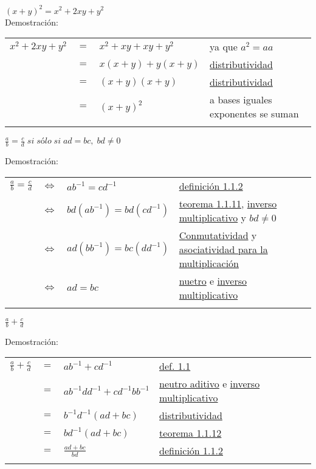 \begin{teo}
$(x+y)^2=x^2+2xy+y^2$\\ \label{teo 1.1.20}
Demostración:
\begin{center}
\begin{tabular}{r c l l}
$x^2+2xy+y^2$&$=$&$x^2+xy+xy+y^2$&ya que $a^2=aa$\\
&$=$&$x(x+y)+y(x+y)$&\hyperref[D]{distributividad}\\
&$=$&$(x+y)(x+y)$&\hyperref[D]{distributividad}\\
&$=$&$(x+y)^2$&a bases iguales exponentes se suman\\\\
\end{tabular}
\end{center}
\end{teo}


\begin{teo}
$\displaystyle\frac{a}{b}=\frac{c}{d}\; si \; sólo \; si \; ad=bc, \; bd\neq 0$\\ \label{teo 1.1.21}

Demostración:
\begin{center}
\begin{tabular}{r c l l}
$\displaystyle\frac{a}{b}=\frac{c}{d}$&$\Leftrightarrow$&$ab^{-1}=cd^{-1}$&\hyperref[def 1.1.2]{definición 1.1.2}\\
&$\Leftrightarrow$&$bd(ab^{-1})=bd(cd^{-1})$&\hyperref[teo 1.1.11]{teorema 1.1.11}, \hyperref[M5]{inverso multiplicativo} y $bd\neq 0$\\
&$\Leftrightarrow$&$ad(bb^{-1})=bc(dd^{-1})$&\hyperref[M2]{Conmutatividad} y \hyperref[M3]{asociatividad para la multiplicación}\\
&$\Leftrightarrow$&$ad=bc$&\hyperref[M4]{nuetro} e \hyperref[M5]{inverso multiplicativo}\\\\
\end{tabular}
\end{center}
\end{teo}


\begin{teo}
$\displaystyle\frac{a}{b} + \frac{c}{d}$\\ \label{1.1.22}

Demostración:
\begin{center}
\begin{tabular}{r c l l}
$\displaystyle\frac{a}{b} + \frac{c}{d}$&$=$&$ab^{-1}+cd^{-1}$&\hyperref[def 1.1]{def. 1.1}\\
&$=$&$ab^{-1}dd^{-1}+cd^{-1}bb^{-1}$&\hyperref[A4]{neutro aditivo} e \hyperref[A5]{inverso multiplicativo}\\
&$=$&$b^{-1}d^{-1}(ad+bc)$&\hyperref[D]{distributividad}\\
&$=$&$bd^{-1}(ad+bc)$&\hyperref[teo 1.1.12]{teorema 1.1.12}\\
&$=$&$\displaystyle\frac{ad+bc}{bd}$&\hyperref[def 1.1.2]{definición 1.1.2}\\\\
\end{tabular}
\end{center}
\end{teo}



